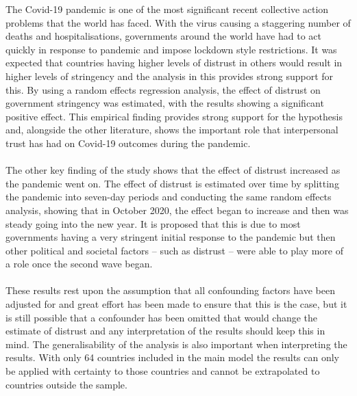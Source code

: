 \documentclass[
  12pt,
]{article}
\begin{document}
The Covid-19 pandemic is one of the most significant recent collective action problems that the world has faced. With the virus causing a staggering number of deaths and hospitalisations, governments around the world have had to act quickly in response to pandemic and impose lockdown style restrictions. It was expected that countries having higher levels of distrust in others would result in higher levels of stringency and the analysis in this provides strong support for this. By using a random effects regression analysis, the effect of distrust on government stringency was estimated, with the results showing a significant positive effect. This empirical finding provides strong support for the hypothesis and, alongside the other literature, shows the important role that interpersonal trust has had on Covid-19 outcomes during the pandemic.\\
~\\
The other key finding of the study shows that the effect of distrust increased as the pandemic went on. The effect of distrust is estimated over time by splitting the pandemic into seven-day periods and conducting the same random effects analysis, showing that in October 2020, the effect began to increase and then was steady going into the new year. It is proposed that this is due to most governments having a very stringent initial response to the pandemic but then other political and societal factors -- such as distrust -- were able to play more of a role once the second wave began.\\
~\\
These results rest upon the assumption that all confounding factors have been adjusted for and great effort has been made to ensure that this is the case, but it is still possible that a confounder has been omitted that would change the estimate of distrust and any interpretation of the results should keep this in mind. The generalisability of the analysis is also important when interpreting the results. With only 64 countries included in the main model the results can only be applied with certainty to those countries and cannot be extrapolated to countries outside the sample.\\
~\\
\end{document}
